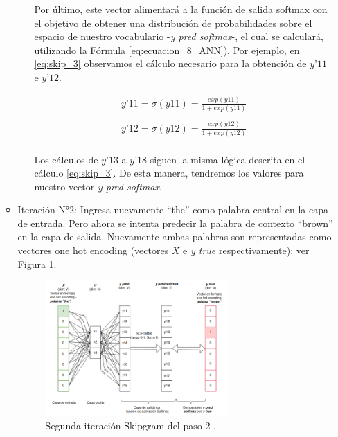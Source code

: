 \documentclass[12pt,a4paper]{article}
\begin{document}
\begin{sloppypar}
\begin{enumerate}
\begin{itemize}
\begin{itemize}
Por último, este vector alimentará a la función de salida softmax con el objetivo de obtener una distribución de probabilidades sobre el espacio de nuestro vocabulario -\textit{y pred softmax}-, el cual se  calculará, utilizando la Fórmula \ref{eq:ecuacion_8_ANN}). Por ejemplo, en \ref{eq:skip_3} observamos el cálculo necesario para la obtención de $y’11$ e $y’12$.

\begin{equation}\label{eq:skip_3}
\begin{gathered}
y’11 = \sigma(y11) = \frac{exp(y11)}{1 + exp(y11)} \\ \\
y’12 = \sigma(y12) = \frac{exp(y12)}{1 + exp(y12)}
\end{gathered}
\end{equation}
\\
Los cálculos de $y’13$ a $y’18$ siguen la misma lógica descrita en el cálculo \ref{eq:skip_3}. De esta manera, tendremos los valores para nuestro vector \textit{y pred softmax}. 

\end{itemize}

\item Iteración N°2: Ingresa nuevamente “the” como palabra central en la capa de entrada. Pero ahora se intenta predecir la palabra de contexto “brown” en la capa de salida. Nuevamente ambas palabras son representadas como vectores one hot encoding (vectores $X$ e \textit{y true} respectivamente): ver Figura \ref{fig:7_EjSkip}. 
\begin{figure}[H]    %
\centering
\includegraphics[width=0.7\textwidth]{images/Ejemplo_Skipgram/7_EjSkip.png}
\caption{Segunda iteración Skipgram del paso 2 .} 
\label{fig:7_EjSkip}
\end{figure}


\end{itemize}
\end{enumerate}
\end{sloppypar}
\end{document}
